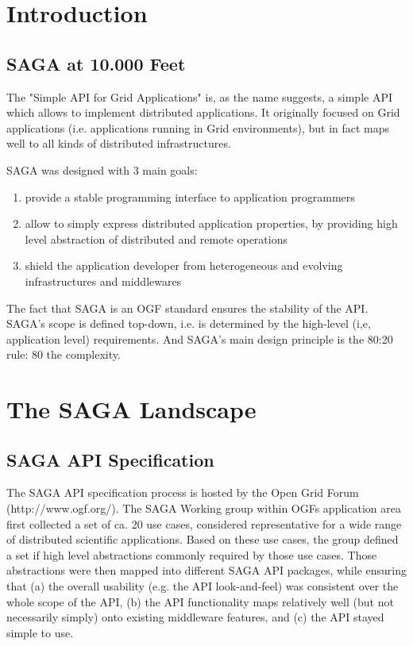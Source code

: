 \documentclass[12pt]{article}
\begin{document}
\section{Introduction}

 \subsection{SAGA at 10.000 Feet}

  The "Simple API for Grid Applications"  is, as the name suggests, a
  simple API which allows to implement distributed applications.  It
  originally focused on Grid applications (i.e. applications running
  in Grid environments), but in fact maps well to all kinds of
  distributed infrastructures.

  SAGA was designed with 3 main goals:

  \begin{enumerate}

   \item provide a stable programming interface to application
   programmers
 
   \item allow to simply express distributed application properties,
   by providing high level abstraction of distributed and remote
   operations
   
   \item shield the application developer from heterogeneous and
   evolving infrastructures and middlewares

  \end{enumerate}
 


  The fact that SAGA is an OGF standard ensures the stability of the
  API.   SAGA's scope is defined top-down, i.e. is determined by the
  high-level (i,e, application level) requirements.  And SAGA's main
  design principle is the 80:20 rule: 80%
  the complexity.

\section{The SAGA Landscape}

 \subsection{SAGA API Specification}

  The SAGA API specification process is hosted by the Open Grid Forum
  (http://www.ogf.org/).  The SAGA Working group within OGFs
  application area first collected a set of ca. 20 use cases,
  considered representative for a wide range of distributed scientific
  applications.  Based on these use cases, the group defined a set if
  high level abstractions commonly required by those use cases.  Those
  abstractions were then mapped into different SAGA API packages,
  while ensuring that (a) the overall usability (e.g. the API
  look-and-feel) was consistent over the whole scope of the API, (b)
  the API functionality maps relatively well (but not necessarily
  simply) onto existing middleware features, and (c) the API stayed
  simple to use.
\end{document}
